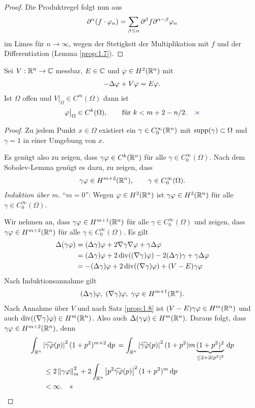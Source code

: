 \begin{proof}
Die Produktregel folgt nun aus
\begin{align*}
\partial^\alpha (f\cdot \varphi_n) = \sum_{\beta\le \alpha} \partial^\beta f
\partial^{\alpha-\beta}\varphi_n
\end{align*}
im Limes für $n\to\infty$, wegen der Stetigkeit der Multiplikation mit $f$ und
der Differentiation (Lemma \ref{prop:1.7}).\qedhere
\end{proof}

\begin{thm}
\label{prop:1.9}
Sei $V:\mathbb{R}^n\to\mathbb{C}$ messbar, $E\in\mathbb{C}$ und $\varphi\in H^2(\mathbb{R}^n)$ mit
\begin{align*}
-\Delta \varphi + V\varphi = E \varphi.
\end{align*}
Ist $\Omega$ offen und $V\big|_\Omega \in C^m(\Omega)$ dann ist
\begin{align*}
\ph\big|_\Omega \in C^k(\Omega),\qquad \text{für }k< m+2-n/2.\fishhere
\end{align*}
\end{thm}
\begin{proof}
Zu jedem Punkt $x\in\Omega$ existiert ein $\gamma\in C_0^\infty(\mathbb{R}^n)$ mit
$\operatorname{supp}(\gamma)\subset\Omega$ und $\gamma = 1$ in einer Umgebung von $x$.

Es genügt also zu zeigen, dass $\gamma\varphi\in C^k(\mathbb{R}^n)$ für alle $\gamma\in
C_0^\infty(\Omega)$. Nach dem Sobolev-Lemma genügt es dazu, zu zeigen, dass
\begin{align*}
\gamma\varphi\in H^{m+2}(\mathbb{R}^n),\qquad \gamma\in C_0^\infty(\Omega).
\end{align*}
\textit{Induktion über $m$}. ``$m=0$'': Wegen $\varphi\in H^2(\mathbb{R}^n)$ ist
$\gamma\varphi\in H^2(\mathbb{R}^n)$ für alle $\gamma\in C_0^\infty(\Omega)$.

Wir nehmen an, dass
$\gamma\varphi\in H^{m+1}(\mathbb{R}^n)$ für alle $\gamma\in C_0^\infty(\Omega)$ und zeigen,
dass $\gamma\varphi\in H^{m+2}(\mathbb{R}^n)$ für alle $\gamma\in C_0^\infty(\Omega)$. Es
gilt
\begin{align*}
\Delta(\gamma\varphi) &= (\Delta \gamma)\varphi + 2\nabla\gamma\nabla \varphi +
\gamma\Delta\varphi\\
&= (\Delta\gamma)\varphi + 2\operatorname{div}((\nabla\gamma)\varphi) - 2(\Delta\gamma)\gamma +
\gamma\Delta\varphi\\
&= -(\Delta\gamma)\varphi + 2\operatorname{div}((\nabla\gamma)\varphi) + (V-E)\gamma\varphi
\end{align*}
Nach Induktionsannahme gilt
\begin{align*}
(\Delta\gamma)\varphi,\;(\nabla\gamma)\varphi,\;\gamma\varphi\in H^{m+1}(\mathbb{R}^n).
\end{align*}
Nach Annahme über $V$ und nach Satz \ref{prop:1.8} ist $(V-E)\gamma\varphi\in
H^m(\mathbb{R}^n)$ und auch $\operatorname{div}((\nabla\gamma)\varphi)\in H^m(\mathbb{R}^n)$. Also auch
$\Delta(\gamma\varphi)\in H^m(\mathbb{R}^n)$. Daraus folgt, dass $\gamma\varphi\in
H^{m+2}(\mathbb{R}^n)$, denn
\begin{align*}
&\int_{\mathbb{R}^n} \left|\widehat{\gamma\varphi}(p)\right|^2 (1+p^2)^{m+2}\,\mathrm{d} p\,
= \int_{\mathbb{R}^n}
\left|\widehat{\gamma\varphi}(p)\right|^2(1+p^2){m}\underbrace{(1+p^2)^2}_{\le 2 +
2(p^2)^2}\,\mathrm{d} p\,\\
&\qquad\le
2\left\|\gamma\varphi\right\|_m^2 + 2\int_{\mathbb{R}^n}
\left|p^2\widehat{\gamma\varphi}(p)\right|^2(1+p^2)^m\,\mathrm{d} p\,\\
&\qquad < \infty.\quad\text{<<}
\end{align*}
\end{proof}
